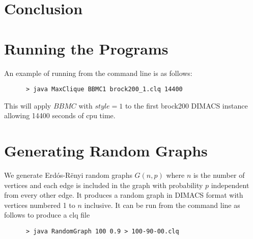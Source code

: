 \documentclass{l4proj}
\begin{document}





\chapter{Conclusion} %
\label{cha:conclusion}




\begin{appendices}

\chapter{Running the Programs}
An example of running from the command line is as follows:
\begin{verbatim}
      > java MaxClique BBMC1 brock200_1.clq 14400
\end{verbatim}
This will apply $BBMC$ with $style = 1$ to the first brock200 DIMACS instance allowing 14400 seconds of cpu time.

\chapter{Generating Random Graphs}
\label{sec:randomGraph}
We generate Erd\'{o}s-R\"{e}nyi random graphs $G(n,p)$ where $n$ is the number of vertices and
each edge is included in the graph with probability $p$ independent from every other edge. It produces
a random graph in DIMACS format with vertices numbered 1 to $n$ inclusive. It can be run from the command line as follows to produce 
a clq file
\begin{verbatim}
      > java RandomGraph 100 0.9 > 100-90-00.clq
\end{verbatim}
\end{appendices}




\end{document}
